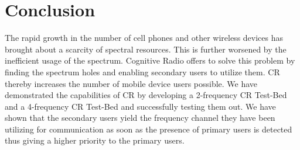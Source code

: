 \chapter{Conclusion}

The rapid growth in the number of cell phones and other wireless devices has 
brought about a scarcity of spectral resources. This is further worsened by the
inefficient usage of the spectrum. Cognitive Radio offers to solve this problem
by finding the spectrum holes and enabling secondary users to utilize them. CR 
thereby increases the number of mobile device users possible. We have 
demonstrated the capabilities of CR by developing a 2-frequency CR Test-Bed and
a 4-frequency CR Test-Bed and successfully testing them out.  We have shown
that the secondary users yield the frequency channel they have been utilizing
for communication as soon as the presence of primary users is detected thus
giving a higher priority to the primary users.
